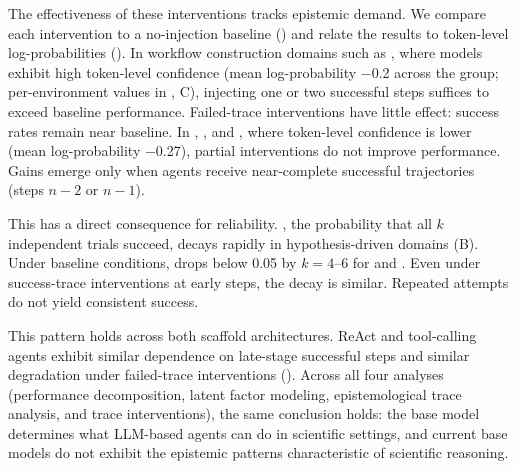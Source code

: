 The effectiveness of these interventions tracks epistemic demand. We compare each intervention to a no-injection baseline () and relate the results to token-level \gptoss log-probabilities (). In workflow construction domains such as \ml, where models exhibit high token-level confidence (mean log-probability $-$0.2 across the group; per-environment values in , C), injecting one or two successful steps suffices to exceed baseline performance. Failed-trace interventions have little effect: success rates remain near baseline. In \spectra, \wetlab, and \retro, where token-level confidence is lower (mean log-probability $-$0.27), partial interventions do not improve performance. Gains emerge only when agents receive near-complete successful trajectories (steps $n{-}2$ or $n{-}1$).

This has a direct consequence for reliability. \passhat, the probability that all $k$ independent trials succeed, decays rapidly in hypothesis-driven domains (B). Under baseline conditions, \passhat drops below 0.05 by $k = 4$--$6$ for \spectra and \wetlab. Even under success-trace interventions at early steps, the decay is similar. Repeated attempts do not yield consistent success.

This pattern holds across both scaffold architectures. ReAct and tool-calling agents exhibit similar dependence on late-stage successful steps and similar degradation under failed-trace interventions (). 
Across all four analyses (performance decomposition, latent factor modeling, epistemological trace analysis, and trace interventions), the same conclusion holds: the base model determines what LLM-based agents can do in scientific settings, and current base models do not exhibit the epistemic patterns characteristic of scientific reasoning.